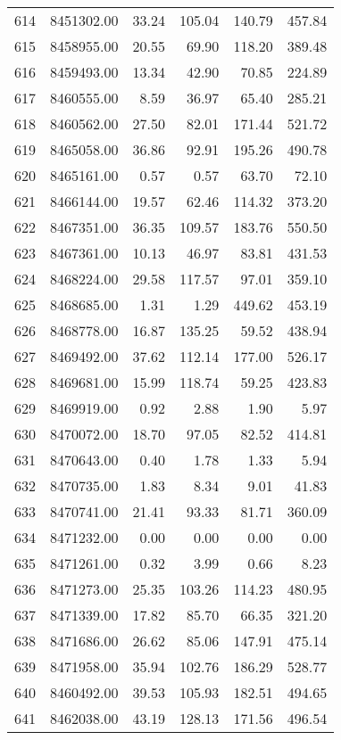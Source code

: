 \begin{table}[ht]
\begin{tabular}{rrrrrr}
  614 & 8451302.00 & 33.24 & 105.04 & 140.79 & 457.84 \\ 
  615 & 8458955.00 & 20.55 & 69.90 & 118.20 & 389.48 \\ 
  616 & 8459493.00 & 13.34 & 42.90 & 70.85 & 224.89 \\ 
  617 & 8460555.00 & 8.59 & 36.97 & 65.40 & 285.21 \\ 
  618 & 8460562.00 & 27.50 & 82.01 & 171.44 & 521.72 \\ 
  619 & 8465058.00 & 36.86 & 92.91 & 195.26 & 490.78 \\ 
  620 & 8465161.00 & 0.57 & 0.57 & 63.70 & 72.10 \\ 
  621 & 8466144.00 & 19.57 & 62.46 & 114.32 & 373.20 \\ 
  622 & 8467351.00 & 36.35 & 109.57 & 183.76 & 550.50 \\ 
  623 & 8467361.00 & 10.13 & 46.97 & 83.81 & 431.53 \\ 
  624 & 8468224.00 & 29.58 & 117.57 & 97.01 & 359.10 \\ 
  625 & 8468685.00 & 1.31 & 1.29 & 449.62 & 453.19 \\ 
  626 & 8468778.00 & 16.87 & 135.25 & 59.52 & 438.94 \\ 
  627 & 8469492.00 & 37.62 & 112.14 & 177.00 & 526.17 \\ 
  628 & 8469681.00 & 15.99 & 118.74 & 59.25 & 423.83 \\ 
  629 & 8469919.00 & 0.92 & 2.88 & 1.90 & 5.97 \\ 
  630 & 8470072.00 & 18.70 & 97.05 & 82.52 & 414.81 \\ 
  631 & 8470643.00 & 0.40 & 1.78 & 1.33 & 5.94 \\ 
  632 & 8470735.00 & 1.83 & 8.34 & 9.01 & 41.83 \\ 
  633 & 8470741.00 & 21.41 & 93.33 & 81.71 & 360.09 \\ 
  634 & 8471232.00 & 0.00 & 0.00 & 0.00 & 0.00 \\ 
  635 & 8471261.00 & 0.32 & 3.99 & 0.66 & 8.23 \\ 
  636 & 8471273.00 & 25.35 & 103.26 & 114.23 & 480.95 \\ 
  637 & 8471339.00 & 17.82 & 85.70 & 66.35 & 321.20 \\ 
  638 & 8471686.00 & 26.62 & 85.06 & 147.91 & 475.14 \\ 
  639 & 8471958.00 & 35.94 & 102.76 & 186.29 & 528.77 \\ 
  640 & 8460492.00 & 39.53 & 105.93 & 182.51 & 494.65 \\ 
  641 & 8462038.00 & 43.19 & 128.13 & 171.56 & 496.54 \\ 

\end{tabular}
\end{table}
